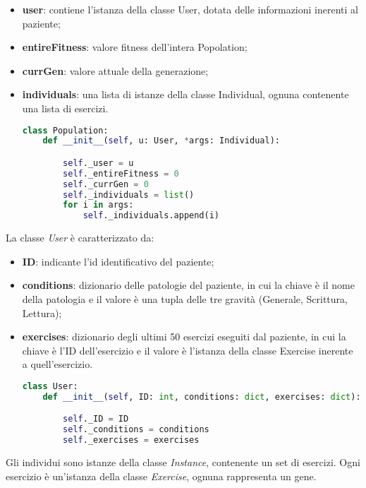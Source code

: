 \documentclass{article}
\begin{document}
\begin{itemize}

\item\textbf{user}: contiene l'istanza della classe User, dotata delle informazioni inerenti al paziente;

\item\textbf{entireFitness}: valore fitness dell'intera Popolation;

\item\textbf{currGen}: valore attuale della generazione;

\item\textbf{individuals}: una lista di istanze della classe Individual, ognuna contenente una lista di esercizi.



\begin{lstlisting}[language = Python]
    class Population:
    def __init__(self, u: User, *args: Individual):

        self._user = u
        self._entireFitness = 0
        self._currGen = 0
        self._individuals = list()
        for i in args:
            self._individuals.append(i)
\end{lstlisting}
\end{itemize}

\bigskip

La classe \textit{User} è caratterizzato da:
\begin{itemize}
\item\textbf{ID}: indicante l'id identificativo del paziente;
\item\textbf{conditions}: dizionario delle patologie del paziente, in cui la chiave è il nome della patologia e il valore è una tupla delle tre gravità (Generale, Scrittura, Lettura);
\item\textbf{exercises}: dizionario degli ultimi 50 esercizi eseguiti dal paziente, in cui la chiave è l'ID dell'esercizio e il valore è l'istanza della classe Exercise inerente a quell'esercizio.
\begin{lstlisting}[language = Python]
    class User:
    def __init__(self, ID: int, conditions: dict, exercises: dict):

        self._ID = ID
        self._conditions = conditions
        self._exercises = exercises
\end{lstlisting}
\end{itemize}
\pagebreak


Gli individui sono istanze della classe \textit{Instance}, contenente un set di esercizi. Ogni esercizio è un'istanza della classe \textit{Exercise}, ognuna rappresenta un gene.
\end{document}
